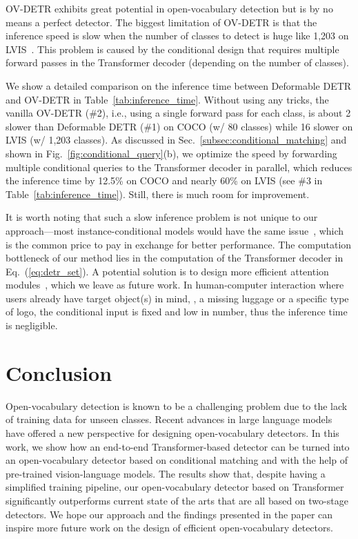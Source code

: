 \documentclass[runningheads]{llncs}
\newcommand{\rowNumber}[1]{\textcolor{Cerulean}{#1}}
\begin{document}
OV-DETR exhibits great potential in open-vocabulary detection but is by no means a perfect detector. The biggest limitation of OV-DETR is that the inference speed is slow when the number of classes to detect is huge like 1,203 on LVIS~\cite{gu2021open}. This problem is caused by the conditional design that requires multiple forward passes in the Transformer decoder (depending on the number of classes). 

We show a detailed comparison on the inference time between Deformable DETR and OV-DETR in Table~\ref{tab:inference_time}. Without using any tricks, the vanilla OV-DETR (\#\rowNumber{2}), i.e., using a single forward pass for each class, is about 2 slower than Deformable DETR (\#\rowNumber{1}) on COCO (w/ 80 classes) while 16 slower on LVIS (w/ 1,203 classes).
As discussed in Sec.~\ref{subsec:conditional_matching} and shown in Fig.~\ref{fig:conditional_query}(b), we optimize the speed by forwarding multiple conditional queries to the Transformer decoder in parallel, which reduces the inference time by 12.5\% on COCO and nearly 60\% on LVIS (see \#\rowNumber{3} in Table~\ref{tab:inference_time}). Still, there is much room for improvement.

It is worth noting that such a slow inference problem is not unique to our approach---most instance-conditional models would have the same issue~\cite{li2017person}, which is the common price to pay in exchange for better performance. The computation bottleneck of our method lies in the computation of the Transformer decoder in Eq.~(\ref{eq:detr_set}). A potential solution is to design more efficient attention modules~\cite{tay2020sparse,wang2020linformer}, which we leave as future work.
In human-computer interaction where users already have target object(s) in mind, \eg, a missing luggage or a specific type of logo, the conditional input is fixed and low in number, thus the inference time is negligible. \section{Conclusion}
Open-vocabulary detection is known to be a challenging problem due to the lack of training data for unseen classes. Recent advances in large language models have offered a new perspective for designing open-vocabulary detectors. In this work, we show how an end-to-end Transformer-based detector can be turned into an open-vocabulary detector based on conditional matching and with the help of pre-trained vision-language models. The results show that, despite having a simplified training pipeline, our open-vocabulary detector based on Transformer significantly outperforms current state of the arts that are all based on two-stage detectors. We hope our approach and the findings presented in the paper can inspire more future work on the design of efficient open-vocabulary detectors.
\end{document}
